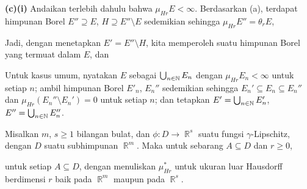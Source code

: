 {\medskip

{\bf (c)(i)} Andaikan terlebih dahulu bahwa $\mu_{Hr}E<\infty$. Berdasarkan
(a), terdapat himpunan Borel $E''\supseteq E$, $H\supseteq E''\setminus E$
sedemikian sehingga $\mu_{Hr}E''=\theta_rE$,


\noindent Jadi, dengan menetapkan $E'=E''\setminus H$, kita memperoleh suatu
himpunan Borel yang termuat dalam $E$, dan


\medskip

 Untuk kasus umum, nyatakan $E$ sebagai $\bigcup_{n\in\Bbb
N}E_n$ dengan $\mu_{Hr}E_n<\infty$ untuk setiap $n$; ambil himpunan Borel
$E'_n$, $E_n''$ sedemikian sehingga $E_n'\subseteq E_n\subseteq E_n''$ dan
$\mu_{Hr}(E_n''\setminus E_n')=0$ untuk setiap $n$; dan tetapkan
$E'=\bigcup_{n\in\Bbb N}E'_n$, $E''=\bigcup_{n\in\Bbb N}E_n''$.
}%

 Misalkan $m$, $s\ge 1$ bilangan bulat, dan
$\phi:D\to\BbbR^s$ suatu fungsi $\gamma$-Lipschitz, dengan $D$ suatu
subhimpunan $\BbbR^m$. Maka untuk sebarang $A\subseteq D$ dan $r\ge 0$,


\noindent untuk setiap $A\subseteq D$, dengan menuliskan $\mu_{Hr}^*$ untuk
ukuran luar Hausdorff berdimensi $r$ baik pada $\BbbR^m$ maupun pada
$\BbbR^s$.

